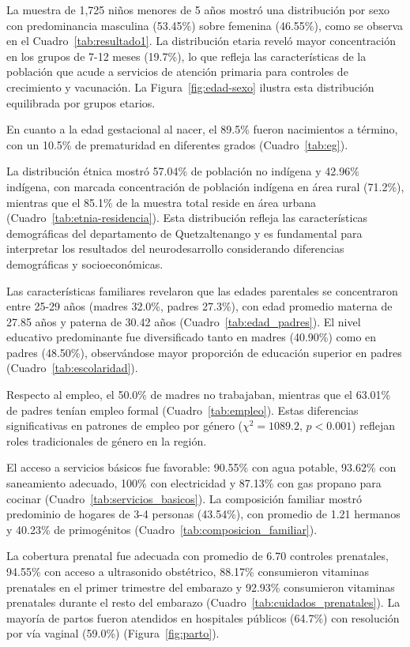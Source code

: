 \documentclass[11pt,letterpaper]{report}
\begin{document}
La muestra de 1,725 niños menores de 5 años mostró una distribución por sexo 
con predominancia masculina (53.45\%) sobre femenina (46.55\%), como se 
observa en el Cuadro~\ref{tab:resultado1}. La distribución etaria reveló mayor 
concentración en los grupos de 7-12 meses (19.7\%), lo que refleja las
características de la población que acude a servicios de 
atención primaria para controles de crecimiento y vacunación. La 
Figura~\ref{fig:edad-sexo} ilustra esta distribución equilibrada por grupos 
etarios.

En cuanto a la edad gestacional al nacer, el 89.5\% fueron nacimientos a 
término, con un 10.5\% de prematuridad en diferentes grados 
(Cuadro~\ref{tab:eg}).

La distribución étnica mostró 57.04\% de población no indígena y 42.96\% 
indígena, con marcada concentración de población indígena en área rural 
(71.2\%), mientras que el 85.1\% de la muestra total reside en área urbana 
(Cuadro~\ref{tab:etnia-residencia}). Esta distribución refleja las 
características demográficas del departamento de Quetzaltenango y es 
fundamental para interpretar los resultados del neurodesarrollo considerando 
diferencias demográficas y socioeconómicas.

Las características familiares revelaron que las edades parentales se 
concentraron entre 25-29 años (madres 32.0\%, padres 27.3\%), con edad 
promedio materna de 27.85 años y paterna de 30.42 años 
(Cuadro~\ref{tab:edad_padres}). El nivel educativo predominante fue 
diversificado tanto en madres (40.90\%) como en padres (48.50\%), 
observándose mayor proporción de educación superior en padres 
(Cuadro~\ref{tab:escolaridad}).

Respecto al empleo, el 50.0\% de madres no trabajaban, mientras que el 63.01\% 
de padres tenían empleo formal (Cuadro~\ref{tab:empleo}). Estas diferencias 
significativas en patrones de empleo por género ($\chi^2 = 1089.2$, 
$p < 0.001$) reflejan roles tradicionales de género en la región.

El acceso a servicios básicos fue favorable: 90.55\% con agua potable, 93.62\% 
con saneamiento adecuado, 100\% con electricidad y 87.13\% con gas propano 
para cocinar (Cuadro~\ref{tab:servicios_basicos}). La composición familiar 
mostró predominio de hogares de 3-4 personas (43.54\%), con promedio de 1.21 
hermanos y 40.23\% de primogénitos (Cuadro~\ref{tab:composicion_familiar}).

La cobertura prenatal fue adecuada con promedio de 6.70 controles prenatales, 
94.55\% con acceso a ultrasonido obstétrico, 88.17\% consumieron vitaminas
prenatales en el primer trimestre del embarazo y 92.93\% consumieron vitaminas
prenatales durante el resto del embarazo (Cuadro~\ref{tab:cuidados_prenatales}). 
La mayoría de partos fueron atendidos en hospitales públicos (64.7\%) con 
resolución por vía vaginal (59.0\%) (Figura~\ref{fig:parto}).
\end{document}
